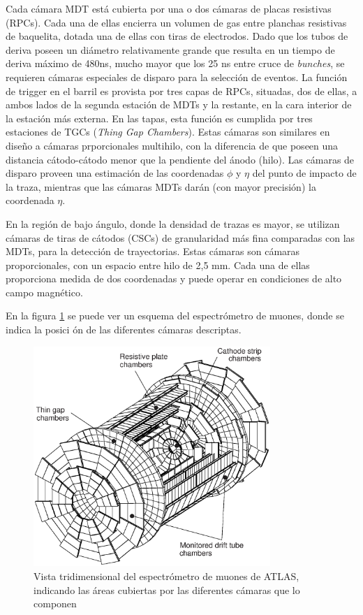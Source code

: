    Cada c\'amara MDT est\'a cubierta por una o dos c\'amaras de placas resistivas (RPCs). Cada una de ellas encierra un volumen de gas entre planchas resistivas de baquelita, dotada una de ellas con tiras de electrodos. Dado que los tubos de deriva poseen un di\'ametro relativamente grande que resulta en un tiempo de deriva m\'aximo de 480ns, mucho mayor que los 25 ns entre cruce de \emph{bunches}, se requieren c\'amaras especiales de disparo para la selecci\'on de eventos. La funci\'on de trigger en el barril es provista por tres capas de RPCs, situadas, dos de ellas, a ambos lados de la segunda estaci\'on de MDTs y la restante, en la cara interior de la estaci\'on m\'as externa. 
En las tapas, esta funci\'on es cumplida por tres estaciones de TGCs (\emph{Thing Gap Chambers}). Estas c\'amaras son similares en dise\~no a c\'amaras prporcionales multihilo, con la diferencia de que poseen una distancia c\'atodo-c\'atodo menor que la pendiente del \'anodo (hilo). 
   Las c\'amaras de disparo proveen una estimaci\'on de las coordenadas $\phi$ y $\eta$ del punto de impacto de la traza, mientras que las c\'amaras MDTs dar\'an (con mayor precisi\'on) la coordenada $\eta$.

    En la regi\'on de bajo \'angulo, donde la densidad de trazas es mayor, se utilizan c\'amaras de tiras de c\'atodos (CSCs) de granularidad m\'as fina comparadas con las MDTs, para la detecci\'on de trayectorias. Estas c\'amaras son c\'amaras proporcionales, con un espacio entre hilo de 2,5 mm. Cada una de ellas proporciona medida de dos coordenadas y puede operar en condiciones de alto campo magn\'etico.

   En la figura \ref{fig:MUON1} se puede ver un esquema del espectr\'ometro de muones, donde se indica la posici \'on de las diferentes c\'amaras descriptas.

\begin{figure}[htbp]
  \begin{center}
      \includegraphics[width=0.8\textwidth]{Fig2/muonspectrometeradele-bw.eps}
    \caption{Vista tridimensional del espectr\'ometro de muones de ATLAS, indicando las \'areas cubiertas por las diferentes c\'amaras que lo componen}
    \label{fig:MUON1}
  \end{center}
\end{figure}



